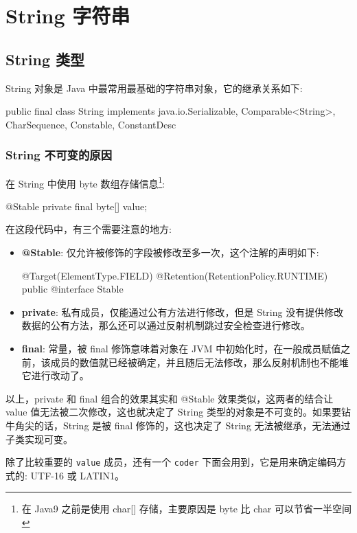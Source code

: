\section{String 字符串}

\subsection{String 类型}

String 对象是 Java 中最常用最基础的字符串对象，它的继承关系如下:

\begin{Java}
public final class String
    implements java.io.Serializable, Comparable<String>, CharSequence, Constable, ConstantDesc 
\end{Java}

\subsubsection{String 不可变的原因}

在 String 中使用 byte 数组存储信息\footnote{在 Java9 之前是使用 char[] 存储，主要原因是 byte 比 char 可以节省一半空间}:

\begin{Java}
@Stable
private final byte[] value;
\end{Java}

在这段代码中，有三个需要注意的地方:
\begin{itemize}
    \item \textbf{@Stable}: 仅允许被修饰的字段被修改至多一次，这个注解的声明如下:
\begin{Java}
@Target(ElementType.FIELD)
@Retention(RetentionPolicy.RUNTIME)
public @interface Stable { }
\end{Java}
    \item \textbf{private}: 私有成员，仅能通过公有方法进行修改，但是 String 没有提供修改数据的公有方法，那么还可以通过反射机制跳过安全检查进行修改。
    \item \textbf{final}: 常量，被 final 修饰意味着对象在 JVM 中初始化时，在一般成员赋值之前，该成员的数值就已经被确定，并且随后无法修改，那么反射机制也不能堆它进行改动了。
\end{itemize}

以上，private 和 final 组合的效果其实和 @Stable 效果类似，这两者的结合让 value 值无法被二次修改，这也就决定了 String 类型的对象是不可变的。如果要钻牛角尖的话，String 是被 final 修饰的，这也决定了 String 无法被继承，无法通过子类实现可变。

除了比较重要的 \texttt{value} 成员，还有一个 \texttt{coder} 下面会用到，它是用来确定编码方式的: UTF-16 或 LATIN1。

